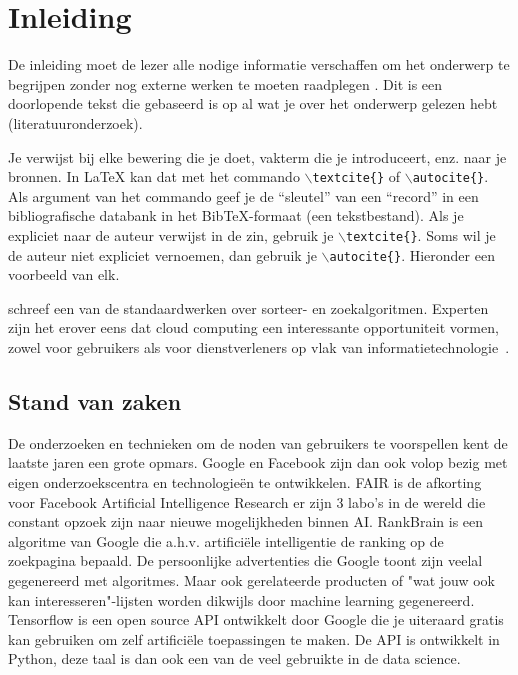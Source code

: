 
\chapter{Inleiding}
\label{ch:inleiding}

De inleiding moet de lezer alle nodige informatie verschaffen om het onderwerp te begrijpen zonder nog externe werken te moeten raadplegen \autocite{Pollefliet2011}. Dit is een doorlopende tekst die gebaseerd is op al wat je over het onderwerp gelezen hebt (literatuuronderzoek).

Je verwijst bij elke bewering die je doet, vakterm die je introduceert, enz. naar je bronnen. In \LaTeX{} kan dat met het commando \texttt{$\backslash${textcite\{\}}} of \texttt{$\backslash${autocite\{\}}}. Als argument van het commando geef je de ``sleutel'' van een ``record'' in een bibliografische databank in het Bib\TeX{}-formaat (een tekstbestand). Als je expliciet naar de auteur verwijst in de zin, gebruik je \texttt{$\backslash${}textcite\{\}}.
Soms wil je de auteur niet expliciet vernoemen, dan gebruik je \texttt{$\backslash${}autocite\{\}}. Hieronder een voorbeeld van elk.

\textcite{Knuth1998} schreef een van de standaardwerken over sorteer- en zoekalgoritmen. Experten zijn het erover eens dat cloud computing een interessante opportuniteit vormen, zowel voor gebruikers als voor dienstverleners op vlak van informatietechnologie~\autocite{Creeger2009}.

\section{Stand van zaken}
\label{sec:stand-van-zaken}



De onderzoeken en technieken om de noden van gebruikers te voorspellen kent de laatste jaren een grote opmars. Google en Facebook zijn dan ook volop bezig met eigen onderzoekscentra en technologieën te ontwikkelen. FAIR is de afkorting voor Facebook Artificial Intelligence Research er zijn 3 labo's in de wereld die constant opzoek zijn naar nieuwe mogelijkheden binnen AI. RankBrain is een algoritme van Google die a.h.v. artificiële intelligentie de ranking op de zoekpagina bepaald.
De persoonlijke advertenties die Google toont zijn veelal gegenereerd met algoritmes.  Maar ook gerelateerde producten of "wat jouw ook kan interesseren"-lijsten worden dikwijls door machine learning gegenereerd. Tensorflow is een open source API ontwikkelt door Google die je uiteraard gratis kan gebruiken om zelf artificiële toepassingen te maken. De API is ontwikkelt in Python, deze taal is dan ook een van de veel gebruikte in de data science.

